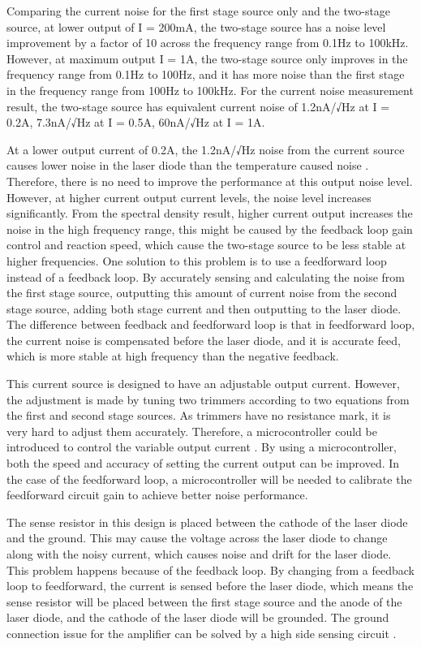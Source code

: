 Comparing the current noise for the first stage source only and the two-stage source, at lower output of I = 200mA, the two-stage source has a noise level improvement by a factor of 10 across the frequency range from 0.1Hz to 100kHz.  However, at maximum output I = 1A, the two-stage source only improves in the frequency range from 0.1Hz to 100Hz, and it has more noise than the first stage in the frequency range from 100Hz to 100kHz.
For the current noise measurement result, the two-stage source has equivalent current noise of 1.2nA/√Hz at I = 0.2A, 7.3nA/√Hz at I = 0.5A, 60nA/√Hz at I = 1A.

At a lower output current of 0.2A, the 1.2nA/√Hz noise from the current source causes lower noise in the laser diode than the temperature caused noise \cite{LinewidthQuantumCascadeLaser}.  Therefore, there is no need to improve the performance at this output noise level.  However, at higher current output current levels, the noise level increases significantly.  From the spectral density result, higher current output increases the noise in the high frequency range, this might be caused by the feedback loop gain control and reaction speed, which cause the two-stage source to be less stable at higher frequencies.  One solution to this problem is to use a feedforward loop instead of a feedback loop.  By accurately sensing and calculating the noise from the first stage source, outputting this amount of current noise from the second stage source, adding both stage current and then outputting to the laser diode.  The difference between feedback and feedforward loop is that in feedforward loop, the current noise is compensated before the laser diode, and it is accurate feed, which is more stable at high frequency than the negative feedback.

This current source is designed to have an adjustable output current.  However, the adjustment is made by tuning two trimmers according to two equations from the first and second stage sources.  As trimmers have no resistance mark, it is very hard to adjust them accurately.  Therefore, a microcontroller could be introduced to control the variable output current \cite{Du_2018}.  By using a microcontroller, both the speed and accuracy of setting the current output can be improved.  In the case of the feedforward loop, a microcontroller will be needed to calibrate the feedforward circuit gain to achieve better noise performance.

The sense resistor in this design is placed between the cathode of the laser diode and the ground.  This may cause the voltage across the laser diode to change along with the noisy current, which causes noise and drift for the laser diode.  This problem happens because of the feedback loop.  By changing from a feedback loop to feedforward, the current is sensed before the laser diode, which means the sense resistor will be placed between the first stage source and the anode of the laser diode, and the cathode of the laser diode will be grounded.  The ground connection issue for the amplifier can be solved by a high side sensing circuit \cite{TI_2019}.
 
